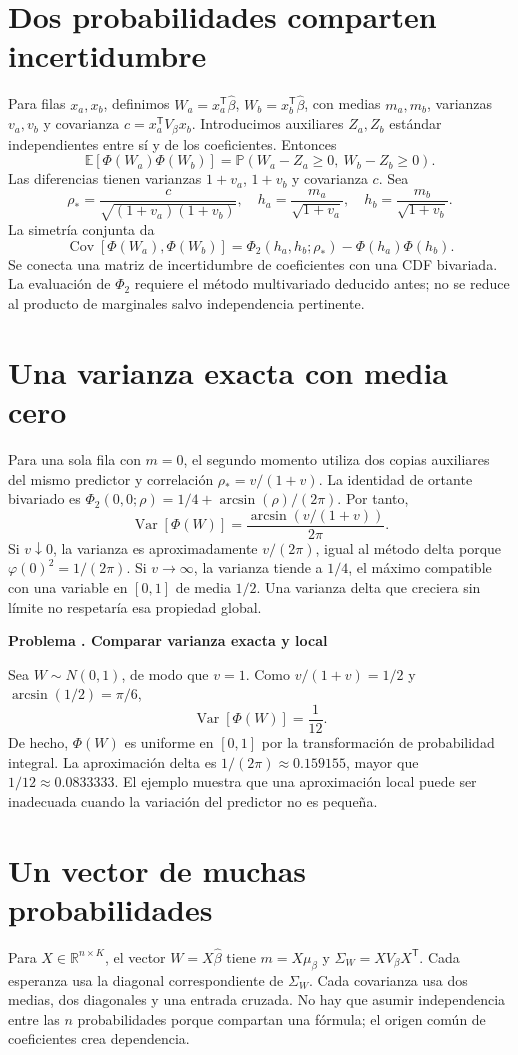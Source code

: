\documentclass[11pt,a4paper]{article}
\newcommand{\R}{\mathbb R}
\newcommand{\E}{\mathbb E}
\newcommand{\Prob}{\mathbb P}
\newcommand{\T}{^{\mathsf T}}
\DeclareMathOperator{\Var}{Var}
\DeclareMathOperator{\Cov}{Cov}
\theoremstyle{definition}
\newcounter{problema}
\newenvironment{resuelto}[1]{\refstepcounter{problema}\par\medskip\Needspace{6\baselineskip}\textbf{Problema \theproblema. #1}\par}{\par\medskip}
\begin{document}
\section{Dos probabilidades comparten incertidumbre}
Para filas $x_a,x_b$, definimos
$W_a=x_a\T\widehat\beta$, $W_b=x_b\T\widehat\beta$,
con medias $m_a,m_b$, varianzas $v_a,v_b$ y covarianza
$c=x_a\T V_\beta x_b$.
Introducimos auxiliares $Z_a,Z_b$ estándar independientes entre sí y de los coeficientes.
Entonces
\[
\E[\Phi(W_a)\Phi(W_b)]
=\Prob(W_a-Z_a\ge0,\ W_b-Z_b\ge0).
\]
Las diferencias tienen varianzas $1+v_a$, $1+v_b$ y covarianza $c$.
Sea
\[
\rho_*=\frac{c}{\sqrt{(1+v_a)(1+v_b)}},\quad
h_a=\frac{m_a}{\sqrt{1+v_a}},\quad
h_b=\frac{m_b}{\sqrt{1+v_b}}.
\]
La simetría conjunta da
\[
\Cov[\Phi(W_a),\Phi(W_b)]
=\Phi_2(h_a,h_b;\rho_*)-\Phi(h_a)\Phi(h_b).
\]
Se conecta una matriz de incertidumbre de coeficientes con una CDF bivariada.
La evaluación de $\Phi_2$ requiere el método multivariado deducido antes; no se reduce al producto de marginales salvo independencia pertinente.

\section{Una varianza exacta con media cero}
Para una sola fila con $m=0$, el segundo momento utiliza dos copias auxiliares del mismo predictor y correlación
$\rho_*=v/(1+v)$.
La identidad de ortante bivariado es
$\Phi_2(0,0;\rho)=1/4+\arcsin(\rho)/(2\pi)$.
Por tanto,
\[
\Var[\Phi(W)]=\frac{\arcsin(v/(1+v))}{2\pi}.
\]
Si $v\downarrow0$, la varianza es aproximadamente $v/(2\pi)$, igual al método delta porque $\varphi(0)^2=1/(2\pi)$.
Si $v\to\infty$, la varianza tiende a $1/4$, el máximo compatible con una variable en $[0,1]$ de media $1/2$.
Una varianza delta que creciera sin límite no respetaría esa propiedad global.

\begin{resuelto}{Comparar varianza exacta y local}
Sea $W\sim N(0,1)$, de modo que $v=1$.
Como $v/(1+v)=1/2$ y $\arcsin(1/2)=\pi/6$,
\[
\Var[\Phi(W)]=\frac1{12}.
\]
De hecho, $\Phi(W)$ es uniforme en $[0,1]$ por la transformación de probabilidad integral.
La aproximación delta es $1/(2\pi)\approx0.159155$, mayor que $1/12\approx0.0833333$.
El ejemplo muestra que una aproximación local puede ser inadecuada cuando la variación del predictor no es pequeña.
\end{resuelto}

\section{Un vector de muchas probabilidades}
Para $X\in\R^{n\times K}$, el vector $W=X\widehat\beta$ tiene
$m=X\mu_\beta$ y $\Sigma_W=XV_\beta X\T$.
Cada esperanza usa la diagonal correspondiente de $\Sigma_W$.
Cada covarianza usa dos medias, dos diagonales y una entrada cruzada.
No hay que asumir independencia entre las $n$ probabilidades porque compartan una fórmula; el origen común de coeficientes crea dependencia.
\end{document}
